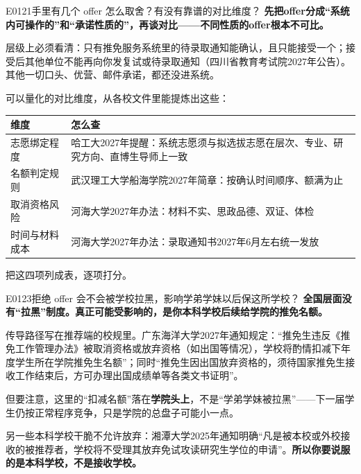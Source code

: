 \begin{qa}{E0121}{手里有几个 offer 怎么取舍？有没有靠谱的对比维度？}
\textbf{先把offer分成“系统内可操作的”和“承诺性质的”，再谈对比——不同性质的offer根本不可比。}

层级上必须看清：只有推免服务系统里的待录取通知能确认，且只能接受一个；接受后其他单位不能再向你发复试或待录取通知（四川省教育考试院2027年公告）。其他一切口头、优营、邮件承诺，都还没进系统。

可以量化的对比维度，从各校文件里能提炼出这些：

\par\vspace{2pt}\nobreak\begin{center}\footnotesize
\begin{tabularx}{\textwidth}{>{\raggedright\arraybackslash}X>{\raggedright\arraybackslash}X}
\toprule
\textbf{维度} & \textbf{怎么查} \\ \midrule
志愿绑定程度 & 哈工大2027年提醒：系统志愿须与拟选拔志愿在层次、专业、研究方向、直博生导师上一致 \\
名额判定规则 & 武汉理工大学船海学院2027年简章：按确认时间顺序、额满为止 \\
取消资格风险 & 河海大学2027年办法：材料不实、思政品德、双证、体检 \\
时间与材料成本 & 河海大学2027年办法：录取通知书2027年6月左右统一发放 \\
\bottomrule
\end{tabularx}
\end{center}\vspace{2pt}\par

把这四项列成表，逐项打分。
\end{qa}

\begin{qa}{E0123}{拒绝 offer 会不会被学校拉黑，影响学弟学妹以后保这所学校？}
\textbf{全国层面没有“拉黑”制度。真正可能受影响的，是你本科学校后续给学院的推免名额。}

传导路径写在推荐端的校规里。广东海洋大学2027年通知规定：“推免生违反《推免工作管理办法》被取消资格或放弃资格（如出国等情况），学校将酌情扣减下年度学生所在学院推免生名额”；同时“推免生因出国放弃资格的，须待国家推免生接收工作结束后，方可办理出国成绩单等各类文书证明”。

但要注意，这里的“扣减名额”落在\textbf{学院头上}，不是“学弟学妹被拉黑”——下一届学生仍按正常程序竞争，只是学院的总盘子可能小一点。

另一些本科学校干脆不允许放弃：湘潭大学2025年通知明确“凡是被本校或外校接收的被推荐者，学校将不受理其放弃免试攻读研究生学位的申请”。\textbf{所以你要说服的是本科学校，不是接收学校。}
\end{qa}

